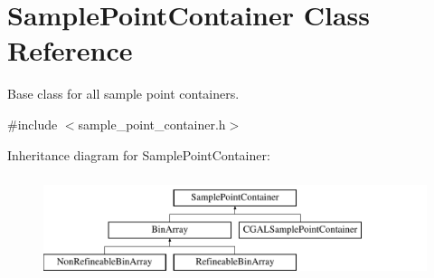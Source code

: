\hypertarget{classSamplePointContainer}{}\section{Sample\+Point\+Container Class Reference}
\label{classSamplePointContainer}


Base class for all sample point containers.  




{\ttfamily \#include $<$sample\+\_\+point\+\_\+container.\+h$>$}

Inheritance diagram for Sample\+Point\+Container\+:\begin{figure}[H]
\begin{center}
\leavevmode
\includegraphics[height=3.000000cm]{classSamplePointContainer}
\end{center}
\end{figure}
